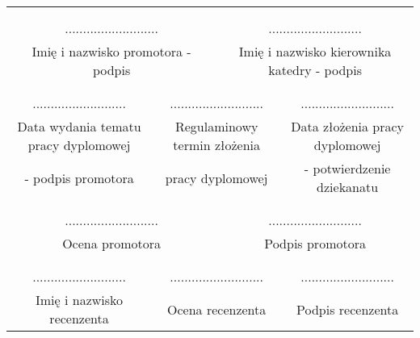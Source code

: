 \begin{titlepage}
\begin{tabular}{cccccc}
\multicolumn{6}{|c|}{}\\
\multicolumn{6}{|c|}{}\\
\multicolumn{3}{|c}{\quad\quad\quad\quad\quad ..........................}&\multicolumn{3}{c|}{..........................}\\
\multicolumn{3}{|c}{\quad\quad\quad\quad\quad \footnotesize{Imię i nazwisko promotora - podpis}}&\multicolumn{3}{c|}{\footnotesize{Imię i nazwisko kierownika katedry - podpis}}\\

\hline

\multicolumn{6}{|c|}{}\\
\multicolumn{6}{|c|}{}\\
\multicolumn{2}{|c}{..........................}&\multicolumn{2}{c}{..........................}&\multicolumn{2}{c|}{..........................}\\
\multicolumn{2}{|c}{\footnotesize{Data wydania tematu pracy dyplomowej}}&\multicolumn{2}{c}{\footnotesize{Regulaminowy termin złożenia}}&\multicolumn{2}{c|}{\footnotesize{Data złożenia pracy dyplomowej}}\\
\multicolumn{2}{|c}{\footnotesize{- podpis promotora}}&\multicolumn{2}{c}{\footnotesize{pracy dyplomowej}}&\multicolumn{2}{c|}{\footnotesize{- potwierdzenie dziekanatu}}\\

\hline

\multicolumn{6}{|c|}{}\\
\multicolumn{6}{|c|}{}\\
\multicolumn{3}{|c}{\quad\quad\quad\quad\quad ..........................}&\multicolumn{3}{c|}{..........................}\\
\multicolumn{3}{|c}{\quad\quad\quad\quad\quad \footnotesize{Ocena promotora}}&\multicolumn{3}{c|}{\footnotesize{Podpis promotora}}\\

\hline

\multicolumn{6}{|c|}{}\\
\multicolumn{6}{|c|}{}\\
\multicolumn{2}{|c}{..........................}&\multicolumn{2}{c}{..........................}&\multicolumn{2}{c|}{..........................}\\
\multicolumn{2}{|c}{\footnotesize{Imię i nazwisko recenzenta}}&\multicolumn{2}{c}{\footnotesize{Ocena recenzenta}}&\multicolumn{2}{c|}{\footnotesize{Podpis recenzenta}}\\

\hline

\end{tabular}
\end{titlepage}



